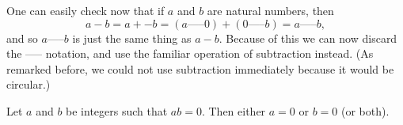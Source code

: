 \begin{note}
    One can easily check now that if \(a\) and \(b\) are natural numbers, then
    \[
        a - b = a + -b = (a \text{-----} 0) + (0 \text{-----} b) = a \text{-----} b,
    \]
    and so \(a \text{-----} b\) is just the same thing as \(a - b\).
    Because of this we can now discard the ----- notation, and use the familiar operation of subtraction instead.
    (As remarked before, we could not use subtraction immediately because it would be circular.)
\end{note}

\begin{proposition}\label{4.1.8}
    Let \(a\) and \(b\) be integers such that \(ab = 0\).
    Then either \(a = 0\) or \(b = 0\) (or both).
\end{proposition}

